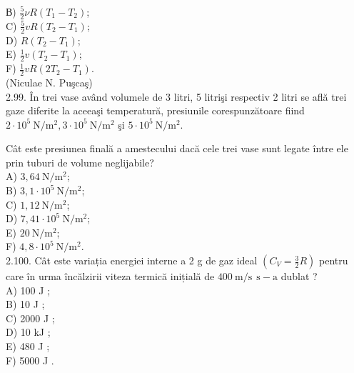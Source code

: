 \documentclass[10pt]{article}
\begin{document}
В) $\frac{5}{2} \nu R\left(T_{1}-T_{2}\right)$;\\
C) $\frac{5}{2} v R\left(T_{2}-T_{1}\right)$;\\
D) $R\left(T_{2}-T_{1}\right)$;\\
E) $\frac{1}{2} v\left(T_{2}-T_{1}\right)$;\\
F) $\frac{1}{2} v R\left(2 T_{2}-T_{1}\right)$.\\
(Niculae N. Puşcaş)\\
2.99. În trei vase având volumele de 3 litri, 5 litrişi respectiv 2 litri se află trei gaze diferite la aceeaşi temperatură, presiunile corespunzătoare fiind $2 \cdot 10^{5} \mathrm{~N} / \mathrm{m}^{2}, 3 \cdot 10^{5} \mathrm{~N} / \mathrm{m}^{2}$ şi $5 \cdot 10^{5} \mathrm{~N} / \mathrm{m}^{2}$.

Cât este presiunea finală a amestecului dacă cele trei vase sunt legate între ele prin tuburi de volume neglijabile?\\
A) $3,64 \mathrm{~N} / \mathrm{m}^{2}$;\\
B) $3,1 \cdot 10^{5} \mathrm{~N} / \mathrm{m}^{2}$;\\
C) $1,12 \mathrm{~N} / \mathrm{m}^{2}$;\\
D) $7,41 \cdot 10^{5} \mathrm{~N} / \mathrm{m}^{2}$;\\
E) $20 \mathrm{~N} / \mathrm{m}^{2}$;\\
F) $4,8 \cdot 10^{5} \mathrm{~N} / \mathrm{m}^{2}$.\\
2.100. Cât este variația energiei interne a 2 g de gaz ideal $\left(C_{V}=\frac{3}{2} R\right)$ pentru care în urma încălzirii viteza termică inițială de $400 \mathrm{~m} / \mathrm{s} ~ \mathrm{~s}-\mathrm{a}$ dublat ?\\
A) 100 J ;\\
B) 10 J ;\\
C) 2000 J ;\\
D) 10 kJ ;\\
E) 480 J ;\\
F) 5000 J .
\end{document}
